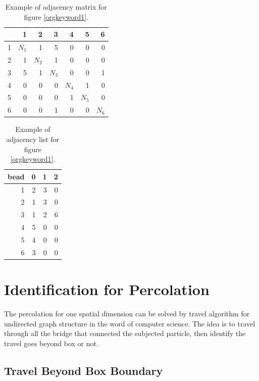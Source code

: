 \documentclass[11pt]{article}
\begin{document}
\begin{table}[htb]
\caption{\label{tab:orgtable3}
Example of adjacency matrix for figure \ref{orgkeyword1}.}
\centering
\begin{tabular}{rrrrrrr}
 & 1 & 2 & 3 & 4 & 5 & 6\\
\hline
1 & \(N_1\) & 1 & 5 & 0 & 0 & 0\\
\hline
2 & 1 & \(N_2\) & 1 & 0 & 0 & 0\\
\hline
3 & 5 & 1 & \(N_3\) & 0 & 0 & 1\\
\hline
4 & 0 & 0 & 0 & \(N_4\) & 1 & 0\\
\hline
5 & 0 & 0 & 0 & 1 & \(N_5\) & 0\\
\hline
6 & 0 & 0 & 1 & 0 & 0 & \(N_6\)\\
\end{tabular}
\end{table}

\begin{table}[htb]
\caption{\label{tab:orgtable4}
Example of adjacency list for figure \ref{orgkeyword1}.}
\centering
\begin{tabular}{rrrr}
bead & 0 & 1 & 2\\
\hline
1 & 2 & 3 & 0\\
2 & 1 & 3 & 0\\
3 & 1 & 2 & 6\\
4 & 5 & 0 & 0\\
5 & 4 & 0 & 0\\
6 & 3 & 0 & 0\\
\end{tabular}
\end{table}


\section{Identification for Percolation}
\label{sec:orgheadline13}
The percolation for one spatial dimension can be solved by travel algorithm for undirected graph structure in the word of computer science. The idea is to travel through all the bridge that connected the subjected particle, then identify the travel goes beyond box or not. 






\subsection{Travel Beyond Box Boundary}
\label{sec:orgheadline6}
\end{document}
